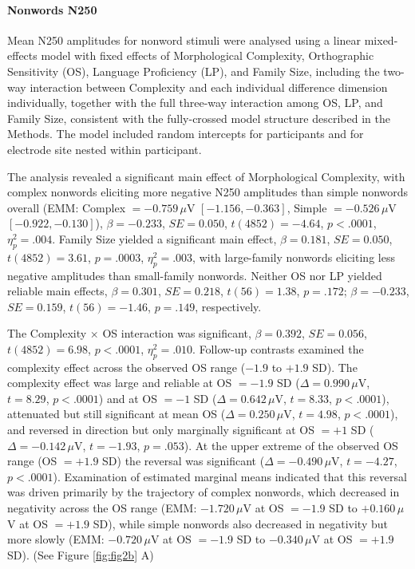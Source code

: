 \documentclass[utf8]{FrontiersinHarvard} %
\begin{document}
	
	\paragraph*{Nonwords N250}
	
	Mean N250 amplitudes for nonword stimuli were analysed using a linear mixed-effects model with fixed effects of Morphological Complexity, Orthographic Sensitivity (OS), Language Proficiency (LP), and Family Size, including the two-way interaction between Complexity and each individual difference dimension individually, together with the full three-way interaction among OS, LP, and Family Size, consistent with the fully-crossed model structure described in the Methods. The model included random intercepts for participants and for electrode site nested within participant.

	The analysis revealed a significant main effect of Morphological Complexity, with complex nonwords eliciting more negative N250 amplitudes than simple nonwords overall (EMM: Complex $= -0.759\,\mu$V $[-1.156, -0.363]$, Simple $= -0.526\,\mu$V $[-0.922, -0.130]$), $\beta = -0.233$, $SE = 0.050$, $t(4852) = -4.64$, $p < .0001$, $\eta^2_p = .004$. Family Size yielded a significant main effect, $\beta = 0.181$, $SE = 0.050$, $t(4852) = 3.61$, $p = .0003$, $\eta^2_p = .003$, with large-family nonwords eliciting less negative amplitudes than small-family nonwords. Neither OS nor LP yielded reliable main effects, $\beta = 0.301$, $SE = 0.218$, $t(56) = 1.38$, $p = .172$; $\beta = -0.233$, $SE = 0.159$, $t(56) = -1.46$, $p = .149$, respectively.

	The Complexity $\times$ OS interaction was significant, $\beta = 0.392$, $SE = 0.056$, $t(4852) = 6.98$, $p < .0001$, $\eta^2_p = .010$. Follow-up contrasts examined the complexity effect across the observed OS range ($-1.9$ to $+1.9$ SD). The complexity effect was large and reliable at OS $= -1.9$ SD ($\Delta = 0.990\,\mu$V, $t = 8.29$, $p < .0001$) and at OS $= -1$ SD ($\Delta = 0.642\,\mu$V, $t = 8.33$, $p < .0001$), attenuated but still significant at mean OS ($\Delta = 0.250\,\mu$V, $t = 4.98$, $p < .0001$), and reversed in direction but only marginally significant at OS $= +1$ SD ($\Delta = -0.142\,\mu$V, $t = -1.93$, $p = .053$). At the upper extreme of the observed OS range (OS $= +1.9$ SD) the reversal was significant ($\Delta = -0.490\,\mu$V, $t = -4.27$, $p < .0001$). Examination of estimated marginal means indicated that this reversal was driven primarily by the trajectory of complex nonwords, which decreased in negativity across the OS range (EMM: $-1.720\,\mu$V at OS $= -1.9$ SD to $+0.160\,\mu$V at OS $= +1.9$ SD), while simple nonwords also decreased in negativity but more slowly (EMM: $-0.720\,\mu$V at OS $= -1.9$ SD to $-0.340\,\mu$V at OS $= +1.9$ SD). (See Figure \ref{fig:fig2b} A)
\end{document}

